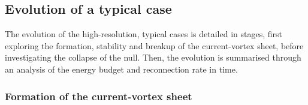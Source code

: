 \subsection{Evolution of a typical case}
\label{sec:null_point_khi_single_case}

The evolution of the high-resolution, typical cases is detailed in stages, first exploring the formation, stability and breakup of the current-vortex sheet, before investigating the collapse of the null. Then, the evolution is summarised through an analysis of the energy budget and reconnection rate in time.

\subsubsection{Formation of the current-vortex sheet}

